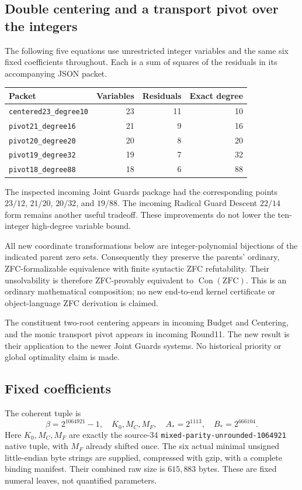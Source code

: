 \subsection{Double centering and a transport pivot over the integers}
\label{sec:integer-projections}

The following five equations use unrestricted integer variables and the
same six fixed coefficients throughout.  Each is a sum of squares of the
residuals in its accompanying JSON packet.
\begin{center}
\begin{tabular}{lrrr}
\hline
Packet & Variables & Residuals & Exact degree\\
\hline
\texttt{centered23\_degree10} &23&11&10\\
\texttt{pivot21\_degree16} &21&9&16\\
\texttt{pivot20\_degree20} &20&8&20\\
\texttt{pivot19\_degree32} &19&7&32\\
\texttt{pivot18\_degree88} &18&6&88\\
\hline
\end{tabular}
\end{center}
The inspected incoming Joint Guards package had the corresponding points
$23/12$, $21/20$, $20/32$, and $19/88$. The incoming Radical Guard Descent
$22/14$ form remains another useful tradeoff. These improvements do not
lower the ten-integer high-degree variable bound.

All new coordinate transformations below are integer-polynomial bijections
of the indicated parent zero sets. Consequently they preserve the parents'
ordinary, ZFC-formalizable equivalence with finite syntactic ZFC refutability.
Their unsolvability is therefore ZFC-provably equivalent to
$\operatorname{Con}(\mathrm{ZFC})$. This is an ordinary mathematical
composition; no new end-to-end kernel certificate or object-language ZFC
derivation is claimed.

The constituent two-root centering appears in incoming Budget and Centering,
and the monic transport pivot appears in incoming Round11. The new result is
their application to the newer Joint Guards systems. No historical priority
or global optimality claim is made.

\subsection{Fixed coefficients}
The coherent tuple is
\[
 \beta=2^{1064921}-1,\quad K_0,M_C,M_F,\quad
 A_*=2^{1113},\quad B_*=2^{666104}.
\]
Here $K_0,M_C,M_F$ are exactly the source-34
\texttt{mixed-parity-unrounded-1064921} native tuple, with $M_F$ already
shifted once. The six actual minimal unsigned little-endian byte strings
are supplied, compressed with gzip, with a complete binding manifest. Their
combined raw size is $615{,}883$ bytes. These are fixed numeral leaves,
not quantified parameters.

